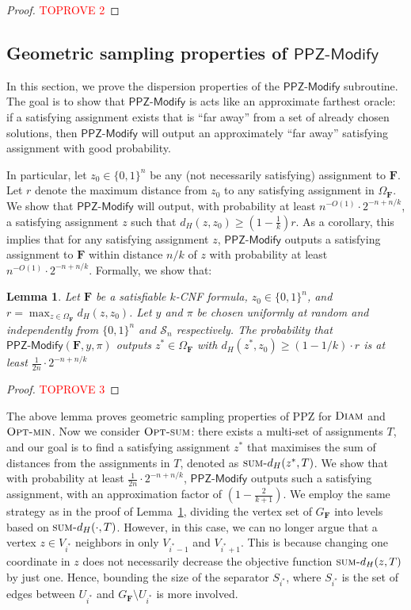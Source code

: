 \documentclass[11pt, letterpaper]{article}
\newtheorem{lemma}[theorem]{Lemma}
\theoremstyle{definition}
\newcommand{\Q}[1]{\{0,1\}^{#1}}
\newcommand{\f}{\mathbf{F}}
\newcommand{\Om}{\Omega_{\f}}
\newcommand{\sumd}{\textsc{sum-}d_H}
\newcommand{\opts}{\textsc{Opt-sum}}
\newcommand{\optm}{\textsc{Opt-min}}
\newcommand{\D}{\textsc{Diam}}
\newcommand{\PPZMod}{\textsf{PPZ-Modify}}
\begin{document}
\begin{proof}\textcolor{red}{TOPROVE 2}\end{proof}

\subsection{Geometric sampling properties of $\PPZMod$} \label{sec:geometric}
In this section, we prove the dispersion properties of the $\PPZMod$ subroutine. The goal is to show that $\PPZMod$ is acts like an approximate farthest oracle: if a satisfying assignment exists that is ``far away'' from a set of already chosen solutions, then $\PPZMod$ will output an approximately ``far away'' satisfying assignment with good probability. 

\medskip\noindent
In particular, let $z_0 \in \Q{n}$ be any (not necessarily satisfying) assignment to $\f$. Let $r$ denote the maximum distance from $z_0$ to any satisfying assignment in $\Omega_\f$. We show that $\PPZMod$ will output, with probability at least $n^{-O(1)} \cdot 2^{-n+n/k}$, a satisfying assignment $z$ such that $d_H(z,z_0) \geq \left(1-\frac{1}{k}\right)r$. As a corollary, this implies that for any satisfying assignment $z$, $\PPZMod$ outputs a satisfying assignment to $\f$ within distance $n/k$ of $z$ with probability at least $n^{-O(1)} \cdot 2^{-n+n/k}$. Formally, we show that:
\begin{lemma}\label{lem:anchor:diam}
    Let $\f$ be a satisfiable $k$-CNF formula, $z_0 \in \{0,1\}^n$, and $r= \max_{z \in \Om} d_H (z, z_0)$. Let $y$ and $\pi$ be chosen uniformly at random and independently from $\{0,1\}^n$ and $\mathcal{S}_n$ respectively. The probability that $\PPZMod(\f, y, \pi)$ outputs $z^* \in \Om$ with $d_H(z^*,z_0) \geq \left(1-1/k\right) \cdot r$ is at least $\frac{1}{2n} \cdot 2^{-n+n/k}$
\end{lemma}
\begin{proof}\textcolor{red}{TOPROVE 3}\end{proof}

The above lemma proves geometric sampling properties of PPZ for $\D$ and $\optm$. Now we consider $\opts$: there exists a multi-set of assignments $T$, and our goal is to find a satisfying assignment $z^*$ that maximises the sum of distances from the assignments in $T$, denoted as $\sumd(z^*,T)$. We show that with probability at least $\frac{1}{2n} \cdot 2^{-n+n/k}$, $\PPZMod$ outputs such a satisfying assignment, with an approximation factor of $\left(1-\frac{2}{k+1}\right)$. We employ the same strategy as in the proof of Lemma~\ref{lem:anchor:diam}, dividing the vertex set of $G_\f$ into levels based on $\sumd(\cdot, T)$. However, in this case, we can no longer argue that a vertex $z \in V_{i^*}$ neighbors in only $V_{i^*-1}$ and $V_{i^*+1}$. This is because changing one coordinate in $z$ does not necessarily decrease the objective function $\sumd(z, T)$ by just one. Hence, bounding the size of the separator $S_{i^*}$, where $S_{i^*}$ is the set of edges between $U_{i^*}$ and $G_{\f} \setminus U_{i^*}$ is more involved.
\end{document}
